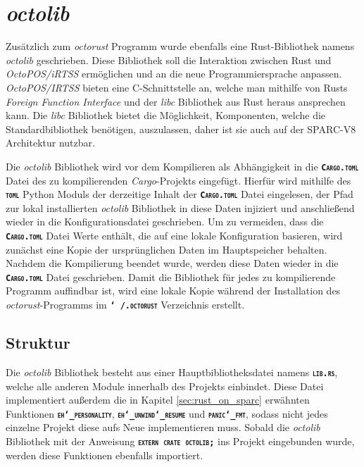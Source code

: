 \section{\textit{octolib}}\label{sec:octolib}

Zusätzlich zum \textit{octorust} Programm wurde ebenfalls eine Rust-Bibliothek namens \textit{octolib} geschrieben. 
Diese Bibliothek soll die Interaktion zwischen Rust und \textit{OctoPOS/iRTSS} ermöglichen und an die neue 
Programmiersprache anpassen. \textit{OctoPOS/IRTSS} bieten eine C-Schnittstelle an, welche man mithilfe von Rusts
\textit{Foreign Function Interface} und der \textit{libc} Bibliothek aus Rust heraus ansprechen kann.
Die \textit{libc} Bibliothek bietet die Möglichkeit, Komponenten, welche die Standardbibliothek benötigen, 
auszulassen, daher ist sie auch auf der SPARC-V8 Architektur nutzbar.

Die \textit{octolib} Bibliothek wird vor dem Kompilieren als Abhängigkeit in die \texttt{\textsc{\textbf{Cargo.toml}}} Datei des
zu kompilierenden \textit{Cargo}-Projekts eingefügt.
Hierfür wird mithilfe des \texttt{\textsc{\textbf{toml}}} Python Moduls der derzeitige Inhalt der \texttt{\textsc{\textbf{Cargo.toml}}} Datei
eingelesen, der Pfad zur lokal installierten \textit{octolib} Bibliothek in diese Daten injiziert und anschließend 
wieder in die Konfigurationsdatei geschrieben.
Um zu vermeiden, dass die \texttt{\textsc{\textbf{Cargo.toml}}} Datei Werte enthält, die auf eine lokale Konfiguration basieren, wird zunächst
eine Kopie der ursprünglichen Daten im Hauptspeicher behalten. Nachdem die Kompilierung beendet
wurde, werden diese Daten wieder in die \texttt{\textsc{\textbf{Cargo.toml}}} Datei geschrieben.
Damit die Bibliothek für jedes zu kompilierende Programm auffindbar ist,
wird eine lokale Kopie während der Installation des \textit{octorust}-Programms im
\texttt{\textsc{\textbf{\char`~/.octorust}}} Verzeichnis erstellt.

\subsection{Struktur}

Die \textit{octolib} Bibliothek besteht aus einer Hauptbibliotheksdatei namens \texttt{\textsc{\textbf{lib.rs}}},
welche alle anderen Module innerhalb des Projekts einbindet. Diese
Datei implementiert außerdem die in Kapitel \ref{sec:rust_on_sparc} erwähnten Funktionen
\texttt{\textsc{\textbf{eh\char`_personality}}}, \texttt{\textsc{\textbf{eh\char`_unwind\char`_resume}}} und
\texttt{\textsc{\textbf{panic\char`_fmt}}}, sodass nicht jedes einzelne Projekt diese aufs Neue implementieren muss. 
Sobald die \textit{octolib} Bibliothek mit der Anweisung \texttt{\textsc{\textbf{extern crate octolib;}}}
ins Projekt eingebunden wurde, werden diese Funktionen ebenfalls importiert.

